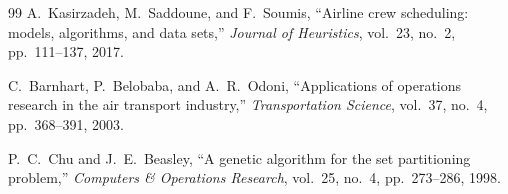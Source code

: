 \documentclass[10pt,journal,compsoc]{IEEEtran}
\begin{document}
\begin{thebibliography}{99}
A.~Kasirzadeh, M.~Saddoune, and F.~Soumis, ``Airline crew scheduling: models, algorithms, and data sets,'' \emph{Journal of Heuristics}, vol.~23, no.~2, pp.~111--137, 2017.

C.~Barnhart, P.~Belobaba, and A.~R.~Odoni, ``Applications of operations research in the air transport industry,'' \emph{Transportation Science}, vol.~37, no.~4, pp.~368--391, 2003.

P.~C.~Chu and J.~E.~Beasley, ``A genetic algorithm for the set partitioning problem,'' \emph{Computers \& Operations Research}, vol.~25, no.~4, pp.~273--286, 1998.

\end{thebibliography}
\end{document}

